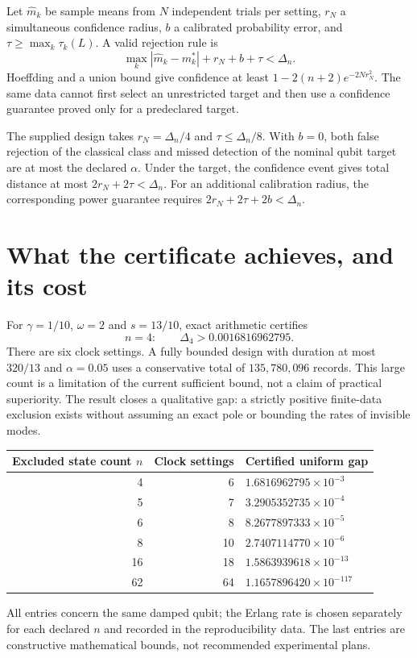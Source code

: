 Let $\widehat m_k$ be sample means from $N$ independent trials per setting,
$r_N$ a simultaneous confidence radius, $b$ a calibrated probability error, and
$\tau\geq\max_k\tau_k(L)$. A valid rejection rule is
\begin{equation}
 \max_k|\widehat m_k-m_k^*|+r_N+b+\tau<\Delta_n.
 \label{eq:erlang-statistical-test}
\end{equation}
Hoeffding and a union bound give confidence at least
$1-2(n+2)e^{-2Nr_N^2}$. The same data cannot first select an unrestricted target
and then use a confidence guarantee proved only for a predeclared target.

The supplied design takes $r_N=\Delta_n/4$ and $\tau\leq\Delta_n/8$. With $b=0$,
both false rejection of the classical class and missed detection of the nominal
qubit target are at most the declared $\alpha$. Under the target, the confidence
event gives total distance at most $2r_N+2\tau<\Delta_n$. For an additional
calibration radius, the corresponding power guarantee requires
$2r_N+2\tau+2b<\Delta_n$.

\section{What the certificate achieves, and its cost}
For $\gamma=1/10$, $\omega=2$ and $s=13/10$, exact arithmetic certifies
\[
 n=4:\qquad\Delta_4>0.0016816962795.
\]
There are six clock settings. A fully bounded design with duration at most
$320/13$ and $\alpha=0.05$ uses a conservative total of $135{,}780{,}096$
records. This large count is a limitation of the current sufficient bound, not
a claim of practical superiority. The result closes a qualitative gap: a
strictly positive finite-data exclusion exists without assuming an exact pole
or bounding the rates of invisible modes.

\begin{center}
\begin{tabular}{r r l}
Excluded state count $n$ & Clock settings & Certified uniform gap\\\hline
4 & 6 & $1.6816962795\times10^{-3}$\\
5 & 7 & $3.2905352735\times10^{-4}$\\
6 & 8 & $8.2677897333\times10^{-5}$\\
8 & 10 & $2.7407114770\times10^{-6}$\\
16 & 18 & $1.5863939618\times10^{-13}$\\
62 & 64 & $1.1657896420\times10^{-117}$
\end{tabular}
\end{center}
All entries concern the same damped qubit; the Erlang rate is chosen separately
for each declared $n$ and recorded in the reproducibility data. The last entries
are constructive mathematical bounds, not recommended experimental plans.

